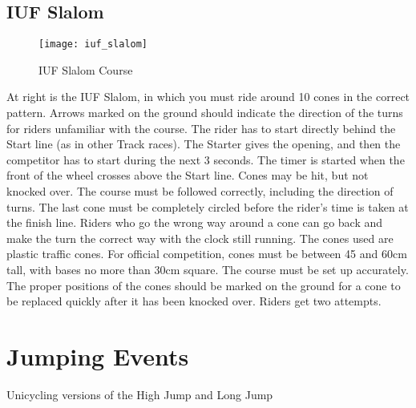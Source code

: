 \subsection{IUF Slalom}
\begin{figure}[h]
\begin{center}
\texttt{[image: iuf\_slalom]}
\end{center}
\vspace{-20pt}
\caption{IUF Slalom Course \label{fig:iuf_slalom}}
\vspace{-10pt}
\end{figure}
At right is the IUF Slalom, in which you must ride around 10 cones in the correct pattern.
Arrows marked on the ground should indicate the direction of the turns for riders unfamiliar with the course.
The rider has to start directly behind the Start line (as in other Track races).
The Starter gives the opening, and then the competitor has to start during the next 3 seconds.
The timer is started when the front of the wheel crosses above the Start line.
Cones may be hit, but not knocked over.
The course must be followed correctly, including the direction of turns.
The last cone must be completely circled before the rider's time is taken at the finish line.
Riders who go the wrong way around a cone can go back and make the turn the correct way with the clock still running.
The cones used are plastic traffic cones.
For official competition, cones must be between 45 and 60cm tall, with bases no more than 30cm square.
The course must be set up accurately.
The proper positions of the cones should be marked on the ground for a cone to be replaced quickly after it has been knocked over.
Riders get two attempts.

\section{Jumping Events \label{sec:racing_jumping-events}}
Unicycling versions of the High Jump and Long Jump 
